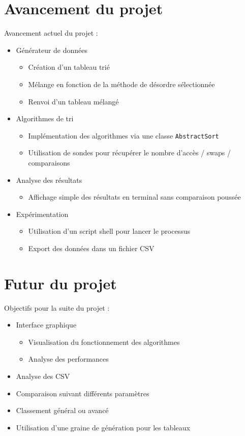 \documentclass[10pt]{beamer}
\begin{document}
\section{Avancement du projet}
\begin{frame}
Avancement actuel du projet :
  \begin{itemize}
    \item <1-> Générateur de données 
      \begin{itemize}
        \item Création d’un tableau trié 
        \item Mélange en fonction de la méthode de désordre sélectionnée 
        \item Renvoi d’un tableau mélangé  
      \end{itemize}
    \item <2-> Algorithmes de tri 
        \begin{itemize}
          \item Implémentation des algorithmes via une classe \texttt{AbstractSort}
          \item Utilisation de sondes pour récupérer le nombre d’accès / swaps / comparaisons
        \end{itemize}
    \item <3-> Analyse des résultats
      \begin{itemize}
        \item Affichage simple des résultats en terminal sans comparaison poussée
      \end{itemize}
    \item <4-> Expérimentation
      \begin{itemize}
        \item Utilisation d’un script shell pour lancer le processus 
        \item Export des données dans un fichier CSV
      \end{itemize}
  \end{itemize}
\end{frame}

\section{Futur du projet}
\begin{frame}
Objectifs pour la suite du projet :
  \begin{itemize}
    \item Interface graphique 
    \begin{itemize}
      \item Visualisation du fonctionnement des algorithmes 
      \item Analyse des performances
    \end{itemize}
    \item Analyse des CSV
    \item Comparaison suivant différents paramètres
    \item Classement général ou avancé
    \item Utilisation d'une graine de génération pour les tableaux
  \end{itemize}
\end{frame}
\end{document}
